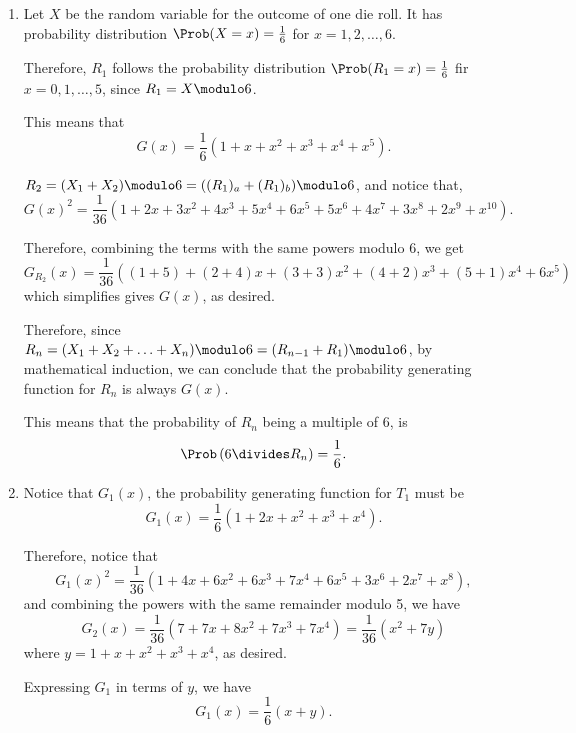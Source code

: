 \Question{\currfilebase}

\begin{enumerate}
    \item Let \(X\) be the random variable for the outcome of one die roll. It has probability distribution \(\Prob(X = x) = \frac{1}{6}\) for \(x = 1, 2, \ldots, 6\).

          Therefore, \(R_1\) follows the probability distribution \(\Prob(R_1 = x) = \frac{1}{6}\) fir \(x = 0, 1, \ldots, 5\), since \(R_1 = X \modulo 6\).

          This means that
          \[
              G(x) = \frac{1}{6} \left(1 + x + x^2 + x^3 + x^4 + x^5\right).
          \]

          \(R_2 = (X_1 + X_2) \modulo 6 = ((R_1)_a + (R_1)_b) \modulo 6\), and notice that,
          \[
              G(x)^2  = \frac{1}{36} \left(1 + 2x + 3x^2 + 4x^3 + 5x^4 + 6x^5 + 5x^6 + 4x^7 + 3x^8 + 2x^9 + x^{10}\right).
          \]

          Therefore, combining the terms with the same powers modulo 6, we get
          \[
              G_{R_2}(x) = \frac{1}{36} \left((1 + 5) + (2 + 4)x + (3 + 3)x^2 + (4 + 2)x^3 + (5 + 1)x^4 + 6 x^5\right)
          \]
          which simplifies gives \(G(x)\), as desired.

          Therefore, since \(R_{n} = (X_1 + X_2 + \ldots + X_n) \modulo 6 = (R_{n - 1} + R_1) \modulo 6\), by mathematical induction, we can conclude that the probability generating function for \(R_n\) is always \(G(x)\).

          This means that the probability of \(R_n\) being a multiple of 6, is
          \[
              \Prob\left(6 \divides R_n\right) = \frac{1}{6}.
          \]

    \item Notice that \(G_1(x)\), the probability generating function for \(T_1\) must be
          \[
              G_1(x) = \frac{1}{6} \left(1 + 2x + x^2 + x^3 + x^4\right).
          \]

          Therefore, notice that
          \[
              G_1(x)^2 = \frac{1}{36} \left(1 + 4x + 6x^2 + 6x^3 + 7x^4 + 6x^5 + 3x^6 + 2x^7 + x^8 \right),
          \]
          and combining the powers with the same remainder modulo 5, we have
          \[
              G_2(x) = \frac{1}{36} \left(7 + 7x + 8x^2 + 7x^3 + 7x^4\right) = \frac{1}{36} \left(x^2 + 7y\right)
          \]
          where \(y = 1 + x + x^2 + x^3 + x^4\), as desired.

          Expressing \(G_1\) in terms of \(y\), we have
          \[
              G_1(x) = \frac{1}{6} (x + y).
          \]


\end{enumerate}
